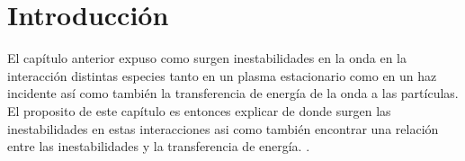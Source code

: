 \documentclass[../tesis_main_file.tex]{subfile}
\begin{document}
\onlyinsubfile{\setcounter{chapter}{1}}
\section{Introducción}
El capítulo anterior expuso como surgen inestabilidades en la onda en la interacción distintas especies tanto en un plasma estacionario como en un haz incidente así como también la transferencia de energía de la onda a las partículas.\\
El proposito de este capítulo es entonces explicar de donde surgen las inestabilidades en estas interacciones asi como también encontrar una relación entre las inestabilidades y la transferencia de energía. \cite{bellan2008fundamentals}.\\
\end{document}
